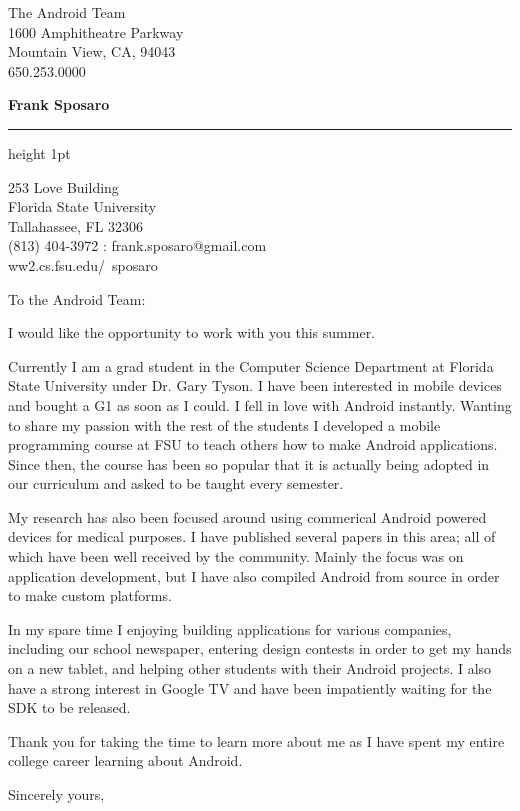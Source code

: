 \documentclass{letter} %
\begin{document}
\signature{Frank Sposaro}
\longindentation=0pt                       %
\let\raggedleft\raggedright                %
 
 
\begin{letter}{The Android Team \\
1600 Amphitheatre Parkway\\
Mountain View, CA, 94043\\
650.253.0000}

\begin{center}
{\large\bf Frank Sposaro} 
\end{center}
\medskip\hrule height 1pt
\begin{center}
{253 Love Building \\   
Florida State University \\ 
Tallahassee, FL 32306 \\ 
(813) 404-3972 : frank.sposaro@gmail.com\\
ww2.cs.fsu.edu/~sposaro}
\end{center} \vfill %
 
 
\opening{To the Android Team:} 
 
\noindent I would like the opportunity to work with you this summer. 
 
\noindent Currently I am a grad student in the Computer Science Department at Florida State University under Dr. Gary Tyson.
I have been interested in mobile devices and bought a G1 as soon as I could. I fell in love with Android instantly.
Wanting to share my passion with the rest of the students I developed a mobile programming course at FSU to teach others
how to make Android applications. Since then, the course has been so popular that it is actually being adopted in our
curriculum and asked to be taught every semester.

My research has also been focused around using commerical Android powered devices for medical purposes. I have published
several papers in this area; all of which have been well received by the community. Mainly the focus was on
application development, but I have also compiled Android from source in order to make custom platforms.

In my spare time I enjoying building applications for various companies, including our school newspaper,
entering design contests in order to get my hands on a new tablet, and helping other students with their Android projects.
I also have a strong interest in Google TV and have been impatiently waiting for the SDK to be released.

Thank you for taking the time to learn more about me as I have spent my entire college career learning about Android.
 
\closing{Sincerely yours,} 
 

 
\end{letter}
 
\end{document}
